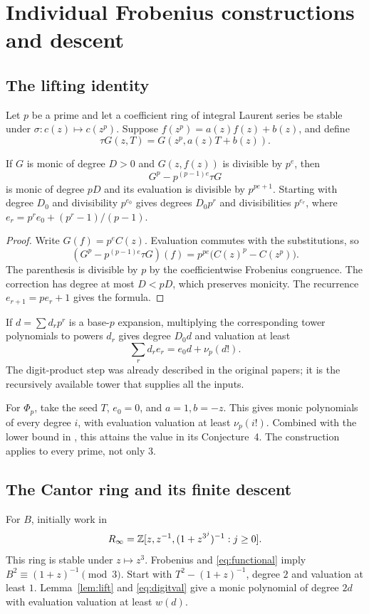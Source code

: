 \section{Individual Frobenius constructions and descent}
\label{sec:lifting}

\subsection{The lifting identity}
Let $p$ be a prime and let a coefficient ring of integral Laurent series
be stable under $\sigma:c(z)\mapsto c(z^p)$. Suppose
$f(z^p)=a(z)f(z)+b(z)$, and define
\[
 \tau G(z,T)=G(z^p,a(z)T+b(z)).
\]

\begin{lemma}\label{lem:lift}
If $G$ is monic of degree $D>0$ and $G(z,f(z))$ is divisible by $p^e$,
then
\[
 G^p-p^{(p-1)e}\tau G
\]
is monic of degree $pD$ and its evaluation is divisible by $p^{pe+1}$.
Starting with degree $D_0$ and divisibility $p^{e_0}$ gives degrees
$D_0p^r$ and divisibilities
$p^{e_r}$, where $e_r=p^re_0+(p^r-1)/(p-1)$.
\end{lemma}
\begin{proof}
Write $G(f)=p^e C(z)$. Evaluation commutes with the substitutions, so
\[
 (G^p-p^{(p-1)e}\tau G)(f)
 =p^{pe}\bigl(C(z)^p-C(z^p)\bigr).
\]
The parenthesis is divisible by $p$ by the coefficientwise Frobenius
congruence. The correction has degree at most $D<pD$, which preserves
monicity. The recurrence $e_{r+1}=pe_r+1$ gives the formula.
\end{proof}

If $d=\sum d_rp^r$ is a base-$p$ expansion, multiplying the corresponding
tower polynomials to powers $d_r$ gives degree $D_0d$ and valuation at least
\begin{equation}\label{eq:digitval}
 \sum_r d_re_r=e_0d+\nu_p(d!).
\end{equation}
The digit-product step was already described in the original papers;
it is the recursively available tower that supplies all the inputs.

For $\Phi_p$, take the seed $T$, $e_0=0$, and $a=1,b=-z$.
This gives monic polynomials of every degree $i$, with evaluation
valuation at least $\nu_p(i!)$. Combined with the lower bound in
\cite[Lemma~1]{KMp}, this attains the value in its Conjecture~4.
The construction applies to every prime, not only $3$.

\subsection{The Cantor ring and its finite descent}
For $B$, initially work in
\[
 R_\infty=\mathbb Z[z,z^{-1},(1+z^{3^j})^{-1}:j\ge0].
\]
This ring is stable under $z\mapsto z^3$. Frobenius and
\eqref{eq:functional} imply $B^2\equiv(1+z)^{-1}\pmod3$.
Start with $T^2-(1+z)^{-1}$, degree $2$ and valuation at least $1$.
Lemma~\ref{lem:lift} and \eqref{eq:digitval} give a monic polynomial
of degree $2d$ with evaluation valuation at least $w(d)$.

